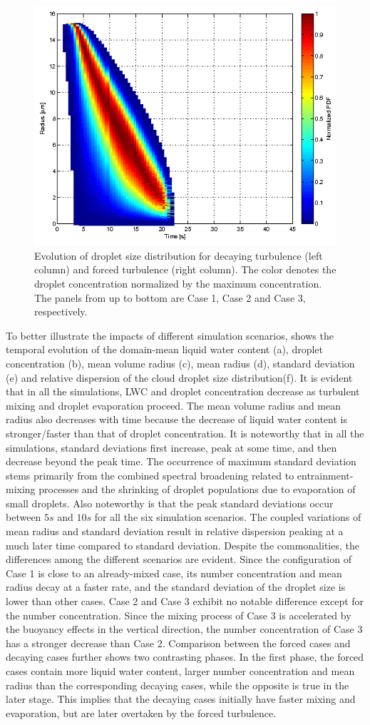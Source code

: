 \documentclass[draft,linenumbers]{agujournal}
\begin{document}
\begin{figure}[!htbp]
\includegraphics[width=0.48\linewidth]{Figures/pdf_radius_f3}
\caption{Evolution of droplet size distribution for decaying turbulence (left column) and forced turbulence (right column). The color denotes the droplet concentration normalized by the maximum concentration. The panels from up to bottom are Case 1, Case 2 and Case 3, respectively.} \label{fig:rad_distri}
\end{figure}

To better illustrate the impacts of different simulation scenarios,  shows the temporal evolution of the domain-mean liquid water content (a), droplet concentration (b), 
mean volume radius (c), mean radius (d), standard deviation (e) and relative dispersion of the cloud droplet size distribution(f). It is evident that in all the simulations, LWC and droplet concentration decrease as turbulent mixing and droplet evaporation proceed. The mean volume radius and mean radius also decreases with time because the decrease of liquid water content is stronger/faster than that of droplet concentration. It is noteworthy that in all the simulations, standard deviations first increase, peak at some time, and then decrease beyond the peak time. The occurrence of maximum standard deviation stems primarily from the combined spectral broadening related to entrainment-mixing processes and the shrinking of droplet populations due to evaporation of small droplets. Also noteworthy is that the peak standard deviations occur between $5s$ and $10s$ for all the six simulation scenarios. The coupled variations of mean radius and standard deviation result in relative dispersion peaking at a much later time compared to standard deviation. Despite the commonalities, the differences among the different scenarios are evident. Since the configuration of Case 1 is close to an already-mixed case, its number concentration and mean radius decay at a faster rate, and the standard deviation of the droplet size is lower than other cases. Case 2 and Case 3 exhibit no notable difference except for the number concentration. Since the mixing process of Case 3 is accelerated by the buoyancy effects in the vertical direction, the number concentration of Case 3 has a stronger decrease than Case 2. Comparison between the forced cases and decaying cases further shows two contrasting phases. In the first phase, the forced cases contain more liquid water content, larger number concentration and mean radius than the corresponding decaying cases, while the opposite is true in the later stage. This implies that the decaying cases initially have faster mixing and evaporation, but are later overtaken by the forced turbulence. 
  
\end{document}
